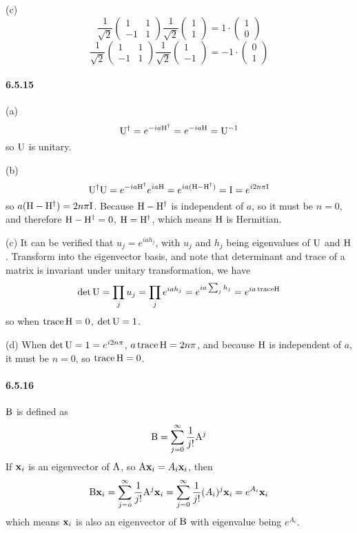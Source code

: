 \documentclass[a4paper]{article}
\begin{document}
(c)
\[
\frac{1}{\sqrt{2}}\begin{pmatrix}
1&1\\-1&1
\end{pmatrix}\frac{1}{\sqrt{2}}
\begin{pmatrix}
1\\1
\end{pmatrix}=1\cdot
\begin{pmatrix}
1\\0
\end{pmatrix}
\]
\[
\frac{1}{\sqrt{2}}\begin{pmatrix}
1&1\\-1&1
\end{pmatrix}\frac{1}{\sqrt{2}}
\begin{pmatrix}
1\\-1
\end{pmatrix}=-1\cdot
\begin{pmatrix}
0\\1
\end{pmatrix}
\]

\paragraph{6.5.15}
(a)
\[
\mathrm{U}^\dagger=e^{-ia\mathrm{H}^\dagger}=e^{-ia\mathrm{H}}=\mathrm{U}^{-1}
\]
so $\mathrm{U}$ is unitary.

(b) 
\[
\mathrm{U}^\dagger\mathrm{U}=e^{-ia\mathrm{H}^\dagger}e^{ia\mathrm{H}}=e^{ia(\mathrm{H-\mathrm{H}^\dagger})}=\mathrm{I}=e^{i2n\pi\mathrm{I}}
\]
so $a(\mathrm{H}-\mathrm{H}^\dagger)=2n\pi\mathrm{I}$. Because $\mathrm{H}-\mathrm{H}^\dagger$ is independent of $a$, so it must be $n=0$, and therefore $\mathrm{H}-\mathrm{H}^\dagger=0$, $\mathrm{H}=\mathrm{H}^\dagger$, which means $\mathrm{H}$ is Hermitian.

(c) It can be verified that $u_j=e^{iah_j}$, with $u_j$ and $h_j$ being eigenvalues of $\mathrm{U}$ and $\mathrm{H}$. Transform into the eigenvector basis, and note that determinant and trace of a matrix is invariant under unitary transformation, we have
\[
\det\mathrm{U}=\prod_j u_j=\prod_j e^{iah_j}=e^{ia\sum_j h_j}=e^{ia\,\mathrm{trace}\mathrm{H}}
\]
so when $\mathrm{trace}\,\mathrm{H}=0$, $\det\mathrm{U}=1$.
\medskip

(d) When $\det\mathrm{U}=1=e^{i2n\pi}$, $a\,\mathrm{trace}\,\mathrm{H}=2n\pi$, and because $\mathrm{H}$ is independent of $a$, it must be $n=
0$, so $\mathrm{trace}\,\mathrm{H}=0$.

\paragraph{6.5.16}
$\mathrm{B}$ is defined as \[\mathrm{B}=\sum_{j=0}^\infty\frac{1}{j!}\mathrm{A}^j\]
If $\mathbf{x}_i$ is an eigenvector of $\mathrm{A}$, so $\mathrm{A}\mathbf{x}_i=A_i\mathbf{x}_i$, then 
\[
\mathrm{B}\mathbf{x}_i=\sum_{j=o}^\infty\frac{1}{j!}\mathrm{A}^j
\mathbf{x}_i=\sum_{j=0}^\infty\frac{1}{j!}(A_i)^j\mathbf{x}_i=e^{A_i}\mathbf{x}_i\]
which means $\mathbf{x}_i$ is also an eigenvector of $\mathrm{B}$ with eigenvalue being $e^{A_i}$.
\end{document}
